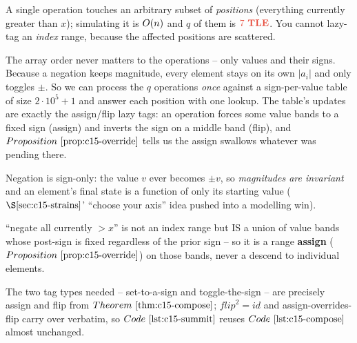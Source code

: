 \begin{attemptgate}
A single operation touches an arbitrary subset of \emph{positions} (everything currently
greater than \(x\)); simulating it is \(O(n)\) and \(q\) of them is \(\tle\). You cannot
lazy-tag an \emph{index} range, because the affected positions are scattered.
\end{attemptgate}

The array order never matters to the operations -- only values and their signs. Because a
negation keeps magnitude, every element stays on its own \(|a_i|\) and only toggles
\(\pm\). So we can process the \(q\) operations \emph{once} against a sign-per-value table
of size \(2\cdot10^5+1\) and answer each position with one lookup. The table's updates are
exactly the assign/flip lazy tags: an operation forces some value bands to a fixed sign
(assign) and inverts the sign on a middle band (flip), and \(\propref{c15-override}\) tells
us the assign swallows whatever was pending there.

\begin{observation}
Negation is sign-only: the value \(v\) ever becomes \(\pm v\), so \emph{magnitudes are
invariant} and an element's final state is a function of only its starting value
(\(\secref{c15-strains}\)' ``choose your axis'' idea pushed into a modelling win).
\end{observation}
\begin{observation}
``negate all currently \(>x\)'' is not an index range but IS a union of value bands whose
post-sign is fixed regardless of the prior sign -- so it is a range \textbf{assign}
(\(\propref{c15-override}\)) on those bands, never a descend to individual elements.
\end{observation}
\begin{observation}
The two tag types needed -- set-to-a-sign and toggle-the-sign -- are precisely
assign and flip from \(\thmref{c15-compose}\); \(\mathit{flip}^2{=}\mathit{id}\) and
assign-overrides-flip carry over verbatim, so \(\coderef{c15-summit}\) reuses
\(\coderef{c15-compose}\) almost unchanged.
\end{observation}

